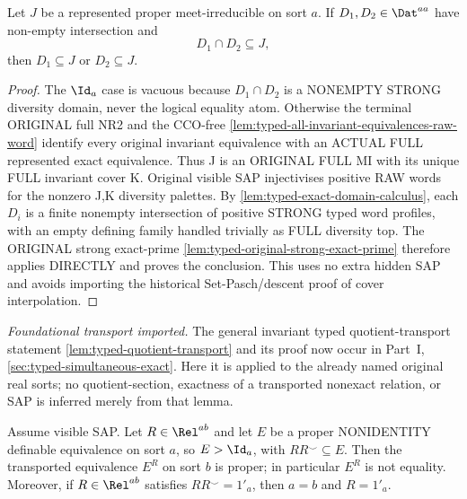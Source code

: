 \begin{lemma}
\label{lem:typed-prime-intersection}
Let \(J\) be a represented proper meet-irreducible on sort \(a\).  If
\(D_1,D_2\in\Dat^{aa}\) have non-empty intersection and
\[
 D_1\cap D_2\subseteq J,
\]
then \(D_1\subseteq J\) or \(D_2\subseteq J\).
\end{lemma}

\begin{proof}
The $\Id_a$ case is vacuous because
$D_1\cap D_2$ is a NONEMPTY
STRONG diversity domain, never
the logical equality atom.
Otherwise the terminal ORIGINAL
full NR2 and the CCO-free
\cref{lem:typed-all-invariant-equivalences-raw-word}
identify every original invariant
equivalence with an ACTUAL FULL
represented exact equivalence.
Thus J is an ORIGINAL FULL MI
with its unique FULL invariant
cover K. Original visible SAP
injectivises positive RAW words
for the nonzero J,K diversity
palettes. By
\cref{lem:typed-exact-domain-calculus},
each $D_i$ is a finite nonempty
intersection of positive STRONG
typed word profiles, with an
empty defining family handled
trivially as FULL diversity top.
The ORIGINAL strong exact-prime
\cref{lem:typed-original-strong-exact-prime}
therefore applies DIRECTLY and
proves the conclusion.
This uses no extra hidden SAP
and avoids importing the
historical Set-Pasch/descent
proof of cover interpolation.

\end{proof}

\noindent\emph{Foundational transport imported.}
The general invariant typed quotient-transport statement
\cref{lem:typed-quotient-transport} and its proof now occur in
Part~I, \cref{sec:typed-simultaneous-exact}.
Here it is applied to the already named original real sorts;
no quotient-section, exactness of a transported nonexact relation,
or SAP is inferred merely from that lemma.

\begin{lemma}
\label{lem:no-real-algebraic-transition}
Assume visible SAP.  Let \(R\in\Rel^{ab}\) and let \(E\) be a proper
NONIDENTITY definable equivalence on sort \(a\), so \(E>\Id_a\), with
\(RR^{\smile}\subseteq E\).  Then the transported equivalence \(E^R\) on
sort \(b\) is proper; in particular \(E^R\) is not equality.
Moreover, if \(R\in\Rel^{ab}\) satisfies
\(RR^{\smile}=1'_a\), then \(a=b\) and \(R=1'_a\).
\end{lemma}

